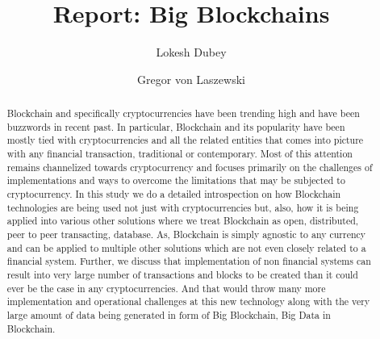 
\title{Report: Big Blockchains}


\author{Lokesh Dubey}

\renewcommand{\shortauthors}{L. Dubey}

\author{Gregor von Laszewski}


\renewcommand{\shortauthors}{G. v. Laszewski}

\begin{abstract}

  Blockchain and specifically cryptocurrencies have been trending high
  and have been buzzwords in recent past. In particular, Blockchain
  and its popularity have been mostly tied with cryptocurrencies and
  all the related entities that comes into picture with any financial
  transaction, traditional or contemporary. Most of this attention
  remains channelized towards cryptocurrency and focuses primarily on
  the challenges of implementations and ways to overcome the
  limitations that may be subjected to cryptocurrency. In this study
  we do a detailed introspection on how Blockchain technologies are
  being used not just with cryptocurrencies but, also, how it is being
  applied into various other solutions where we treat Blockchain as
  open, distributed, peer to peer transacting, database. As,
  Blockchain is simply agnostic to any currency and can be applied to
  multiple other solutions which are not even closely related to a
  financial system. Further, we discuss that implementation of non
  financial systems can result into very large number of transactions
  and blocks to be created than it could ever be the case in any
  cryptocurrencies. And that would throw many more implementation and
  operational challenges at this new technology along with the very
  large amount of data being generated in form of Big Blockchain, Big
  Data in Blockchain.

\end{abstract}



